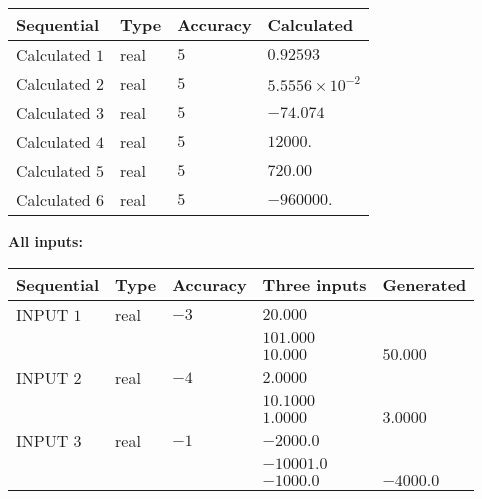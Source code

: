 \documentclass[12pt]{article}
\begin{document}
   
   
   
\noindent{}
   
   
  
  
\noindent\begin{tabular}{|l|l|l|l|}
\hline
 Sequential & Type & Accuracy & Calculated \\ 
\hline
 
 
  Calculated $            1 $ & real & $            5  $ & 
 $ 0.92593 $ 
 \\  \hline  
 
 
  Calculated $            2 $ & real & $            5  $ & 
 $ 5.5556 \times 10^{-2} $ 
 \\  \hline  
 
 
  Calculated $            3 $ & real & $            5  $ & 
 $ -74.074 $ 
 \\  \hline  
 
 
  Calculated $            4 $ & real & $            5  $ & 
 $ 12000. $ 
 \\  \hline  
 
 
  Calculated $            5 $ & real & $            5  $ & 
 $ 720.00 $ 
 \\  \hline  
 
 
  Calculated $            6 $ & real & $            5  $ & 
 $ -960000. $ 
 \\  \hline  
 \end{tabular}
   
   
   
   
\noindent\vspace{0.1in}\hspace{-0.08in} {\textbf{\Large{All inputs: }}}
   
   
  
  
\noindent\begin{tabular}{|l|l|l|l|l|}
\hline
 Sequential & Type & Accuracy & Three inputs & Generated \\ 
\hline
 
 
  INPUT $            1 $ & real & $           -3  $ & $
 20.000
  $ & \\
  & & &  $
 101.000
  $ & \\
  & & &  $
 10.000
 $ & $ 50.000 $ 
 \\  \hline  
 
 
  INPUT $            2 $ & real & $           -4  $ & $
 2.0000
  $ & \\
  & & &  $
 10.1000
  $ & \\
  & & &  $
 1.0000
 $ & $ 3.0000 $ 
 \\  \hline  
 
 
  INPUT $            3 $ & real & $           -1  $ & $
 -2000.0
  $ & \\
  & & &  $
 -10001.0
  $ & \\
  & & &  $
 -1000.0
 $ & $ -4000.0 $ 
 \\  \hline  
 \end{tabular}
   
\end{document}
